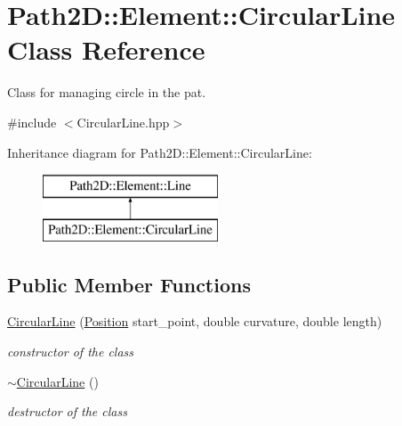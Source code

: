 \hypertarget{class_path2_d_1_1_element_1_1_circular_line}{}\section{Path2D\+:\+:Element\+:\+:Circular\+Line Class Reference}
\label{class_path2_d_1_1_element_1_1_circular_line}


Class for managing circle in the pat.  




{\ttfamily \#include $<$Circular\+Line.\+hpp$>$}

Inheritance diagram for Path2D\+:\+:Element\+:\+:Circular\+Line\+:\begin{figure}[H]
\begin{center}
\leavevmode
\includegraphics[height=2.000000cm]{class_path2_d_1_1_element_1_1_circular_line}
\end{center}
\end{figure}
\subsection*{Public Member Functions}
\begin{DoxyCompactItemize}
\item 
\mbox{\hyperlink{class_path2_d_1_1_element_1_1_circular_line_acb8d63253b111784eb95dd1ae77ba083}{Circular\+Line}} (\mbox{\hyperlink{class_path2_d_1_1_element_1_1_position}{Position}} start\+\_\+point, double curvature, double length)
\begin{DoxyCompactList}\small\item\em constructor of the class \end{DoxyCompactList}\item 
\mbox{\label{class_path2_d_1_1_element_1_1_circular_line_a63a787df3c97311f78dd6ad8cfbb3a3b}} 
\mbox{\hyperlink{class_path2_d_1_1_element_1_1_circular_line_a63a787df3c97311f78dd6ad8cfbb3a3b}{$\sim$\+Circular\+Line}} ()
\begin{DoxyCompactList}\small\item\em destructor of the class \end{DoxyCompactList}\end{DoxyCompactItemize}


